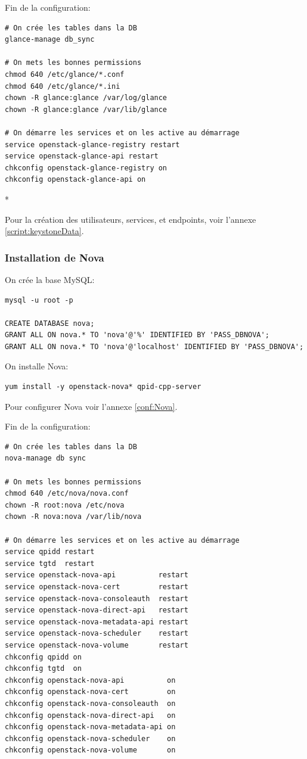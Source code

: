 \documentclass[a4paper,oneside]{report}
\begin{document}
\noindent Fin de la configuration:
\begin{verbatim}
# On crée les tables dans la DB
glance-manage db_sync

# On mets les bonnes permissions
chmod 640 /etc/glance/*.conf
chmod 640 /etc/glance/*.ini
chown -R glance:glance /var/log/glance
chown -R glance:glance /var/lib/glance

# On démarre les services et on les active au démarrage
service openstack-glance-registry restart
service openstack-glance-api restart
chkconfig openstack-glance-registry on
chkconfig openstack-glance-api on
\end{verbatim}*

\noindent Pour la création des utilisateurs, services, et endpoints, voir l'annexe \ref{script:keystoneData}.

\subsubsection{Installation de Nova}
\noindent On crée la base MySQL:
\begin{verbatim}
mysql -u root -p

CREATE DATABASE nova;
GRANT ALL ON nova.* TO 'nova'@'%' IDENTIFIED BY 'PASS_DBNOVA';
GRANT ALL ON nova.* TO 'nova'@'localhost' IDENTIFIED BY 'PASS_DBNOVA';
\end{verbatim}

\noindent On installe Nova:
\begin{verbatim}
yum install -y openstack-nova* qpid-cpp-server
\end{verbatim}

\noindent Pour configurer Nova voir l'annexe \ref{conf:Nova}.

\noindent Fin de la configuration:
\begin{verbatim}
# On crée les tables dans la DB
nova-manage db sync

# On mets les bonnes permissions
chmod 640 /etc/nova/nova.conf
chown -R root:nova /etc/nova
chown -R nova:nova /var/lib/nova

# On démarre les services et on les active au démarrage
service qpidd restart
service tgtd  restart
service openstack-nova-api          restart
service openstack-nova-cert         restart
service openstack-nova-consoleauth  restart
service openstack-nova-direct-api   restart
service openstack-nova-metadata-api restart
service openstack-nova-scheduler    restart
service openstack-nova-volume       restart
chkconfig qpidd on
chkconfig tgtd  on
chkconfig openstack-nova-api          on
chkconfig openstack-nova-cert         on
chkconfig openstack-nova-consoleauth  on
chkconfig openstack-nova-direct-api   on
chkconfig openstack-nova-metadata-api on
chkconfig openstack-nova-scheduler    on
chkconfig openstack-nova-volume       on
\end{verbatim}
\end{document}
